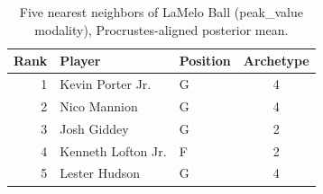 \begin{table}[htbp]
  \centering\small
  \begin{tabular}{rllc}
    \toprule
    Rank & Player & Position & Archetype \\
    \midrule
    1 & Kevin Porter Jr. & G & 4 \\
    2 & Nico Mannion & G & 4 \\
    3 & Josh Giddey & G & 2 \\
    4 & Kenneth Lofton Jr. & F & 2 \\
    5 & Lester Hudson & G & 4 \\
    \bottomrule
  \end{tabular}
  \caption{Five nearest neighbors of LaMelo Ball (peak_value modality), Procrustes-aligned posterior mean.}
  \label{tab:LaMelo_Ball_neighbors_peak_value}
\end{table}

